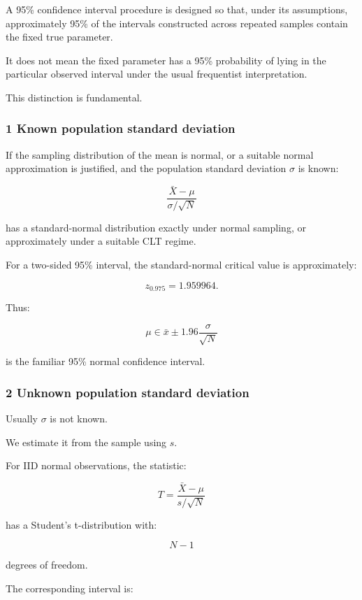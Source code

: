 A 95\% confidence interval procedure is designed so that, under its assumptions, approximately 95\% of the intervals constructed across repeated samples contain the fixed true parameter.

It does not mean the fixed parameter has a 95\% probability of lying in the particular observed interval under the usual frequentist interpretation.

This distinction is fundamental.

\subsubsection{1 Known population standard deviation}\label{02-foundations-ii-ch030-known-population-standard-deviation}

If the sampling distribution of the mean is normal, or a suitable normal approximation is justified, and the population standard deviation \(\sigma\) is known:

\[
 \frac{\bar X-\mu}{\sigma/\sqrt N}
\]

has a standard-normal distribution exactly under normal sampling, or approximately under a suitable CLT regime.

For a two-sided 95\% interval, the standard-normal critical value is approximately:

\[
 z_{0.975}=1.959964.
\]

Thus:

\[
 \boxed{ \mu\in \bar x\pm1.96\frac{\sigma}{\sqrt N} }
\]

is the familiar 95\% normal confidence interval.

\subsubsection{2 Unknown population standard deviation}\label{02-foundations-ii-ch030-unknown-population-standard-deviation}

Usually \(\sigma\) is not known.

We estimate it from the sample using \(s\).

For IID normal observations, the statistic:

\[
 \boxed{ T= \frac{\bar X-\mu}{s/\sqrt N} }
\]

has a Student's t-distribution with:

\[
 N-1
\]

degrees of freedom.

The corresponding interval is:

